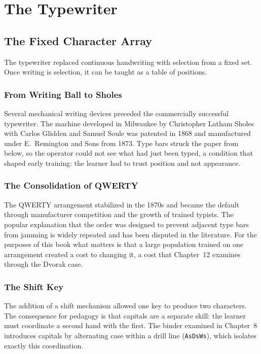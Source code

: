 \part{The Typewriter}

\chapter{The Fixed Character Array}

The typewriter replaced continuous handwriting with selection from a fixed set. Once writing is selection, it can be taught as a table of positions.

\section{From Writing Ball to Sholes}

Several mechanical writing devices preceded the commercially successful typewriter. The machine developed in Milwaukee by Christopher Latham Sholes with Carlos Glidden and Samuel Soule was patented in 1868 and manufactured under E.~Remington and Sons from 1873.  Type bars struck the paper from below, so the operator could not see what had just been typed, a condition that shaped early training: the learner had to trust position and not appearance.

\section{The Consolidation of QWERTY}

The QWERTY arrangement stabilized in the 1870s and became the default through manufacturer competition and the growth of trained typists. The popular explanation that the order was designed to prevent adjacent type bars from jamming is widely repeated and has been disputed in the literature.  For the purposes of this book what matters is that a large population trained on one arrangement created a cost to changing it, a cost that Chapter~12 examines through the Dvorak case.

\section{The Shift Key}

The addition of a shift mechanism allowed one key to produce two characters. The consequence for pedagogy is that capitals are a separate skill: the learner must coordinate a second hand with the first. The binder examined in Chapter~8 introduces capitals by alternating case within a drill line (\texttt{AsDsWs}), which isolates exactly this coordination.

